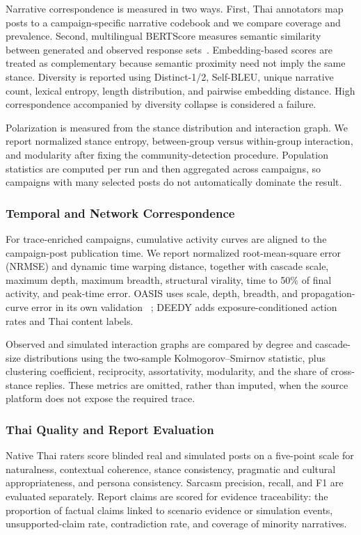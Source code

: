 \documentclass[conference]{IEEEtran}
\begin{document}
Narrative correspondence is measured in two ways. First, Thai annotators map
posts to a campaign-specific narrative codebook and we compare coverage and
prevalence. Second, multilingual BERTScore measures semantic similarity between
generated and observed response sets~\cite{zhang2020bertscore}. Embedding-based
scores are treated as complementary because semantic proximity need not imply
the same stance. Diversity is reported using Distinct-1/2, Self-BLEU, unique
narrative count, lexical entropy, length distribution, and pairwise embedding
distance. High correspondence accompanied by diversity collapse is considered
a failure.

Polarization is measured from the stance distribution and interaction graph.
We report normalized stance entropy, between-group versus within-group
interaction, and modularity after fixing the community-detection procedure.
Population statistics are computed per run and then aggregated across
campaigns, so campaigns with many selected posts do not automatically dominate
the result.

\subsubsection{Temporal and Network Correspondence}

For trace-enriched campaigns, cumulative activity curves are aligned to the
campaign-post publication time. We report normalized root-mean-square error
(NRMSE) and dynamic time
warping distance, together with cascade scale, maximum depth, maximum breadth,
structural virality, time to 50\% of final activity, and peak-time error. OASIS
uses scale, depth, breadth, and propagation-curve error in its own validation
~\cite{yang2024oasis}; DEEDY adds exposure-conditioned action rates and Thai
content labels.

Observed and simulated interaction graphs are compared by degree and cascade-
size distributions using the two-sample Kolmogorov--Smirnov statistic, plus
clustering coefficient, reciprocity, assortativity, modularity, and the share
of cross-stance replies. These metrics are omitted, rather than imputed, when
the source platform does not expose the required trace.

\subsubsection{Thai Quality and Report Evaluation}

Native Thai raters score blinded real and simulated posts on a five-point scale
for naturalness, contextual coherence, stance consistency, pragmatic and
cultural appropriateness, and persona consistency. Sarcasm precision, recall,
and F1 are evaluated separately. Report claims are scored for evidence
traceability: the proportion of factual claims linked to scenario evidence or
simulation events, unsupported-claim rate, contradiction rate, and coverage of
minority narratives.
\end{document}
